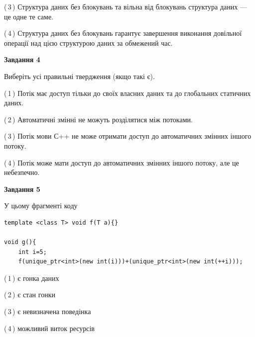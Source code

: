 \documentclass[12pt, ukrainian]{article}
\begin{document}
\begin {large}
{(\,3\,) Структура даних без блокувань та вільна від блокувань структура даних --- це одне те саме.%

(\,4\,) Структура даних без блокувань гарантує завершення виконання довільної операції над цією структурою даних за обмежений час.%



\begin{center}
\textbf{Завдання 4}
\end{center}
Виберіть усі правильні твердження (якщо такі є).\par
\vspace{2mm}

(\,1\,) Потік має доступ тільки до своїх власних даних та до глобальних статичних даних.%

(\,2\,) Автоматичні змінні не можуть розділятися між потоками.%

(\,3\,) Потік мови С++ не може отримати доступ до автоматичних змінних іншого потоку.%

(\,4\,) Потік може мати доступ до автоматичних змінних іншого потоку, але це небезпечно.%



\begin{center}
\textbf{Завдання 5}
\end{center}
У цьому фрагменті коду
\begin{verbatim}
template <class T> void f(T a){}

void g(){
    int i=5;
    f(unique_ptr<int>(new int(i)))+(unique_ptr<int>(new int(++i)));
\end{verbatim}
(\,1\,) є гонка даних%

(\,2\,) є стан гонки%

(\,3\,) є невизначена поведінка%

(\,4\,) можливий виток ресурсів%


}
\end {large}
\end{document}
